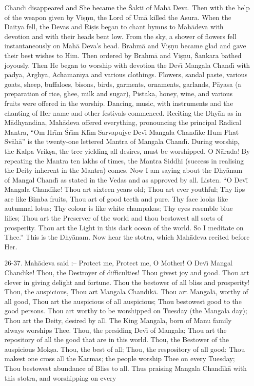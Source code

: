 Chand\={\i} disappeared and She became the \'Sakti of Mah\=a Deva. Then with the help of the weapon given by Vi\d{s}\d{n}u, the Lord of Um\=a killed the Asura. When the Daitya fell, the Devas and \d{R}i\d{s}is began to chant hymns to Mah\=adeva with devotion and with their heads bent low. From the sky, a shower of flowers fell instantaneously on Mah\=a Deva's head. Brahm\=a and Vi\d{s}\d{n}u became glad and gave their best wishes to Him. Then ordered by Brahm\=a and Vi\d{s}\d{n}u, \'Sankara bathed joyously. Then He began to worship with devotion the Dev\={\i} Mangala Chand\={\i} with p\=adya, Arghya, \=Achaman\={\i}ya and various clothings. Flowers, sandal paste, various goats, sheep, buffaloes, bisons, birds, garments, ornaments, garlands, P\=ayasa (a preparation of rice, ghee, milk and sugar), Pistaka, honey, wine, and various fruits were offered in the worship. Dancing, music, with instruments and the chanting of Her name and other festivals commenced. Reciting the Dhy\=an as in M\=adhyandina, Mah\=adeva offered everything, pronouncing the principal Radical Mantra, ``Om Hr\={\i}m \'Sr\={\i}m Kl\={\i}m Sarvapujye Dev\={\i} Mangala Chand\={\i}ke Hum Phat Sv\=ah\=a'' is the twenty-one lettered Mantra of Mangala Chand\={\i}. During worship, the Kalpa Vrik\d{s}a, the tree yielding all desires, must be worshipped. O N\=arada! By repeating the Mantra ten lakhs of times, the Mantra Siddhi (success in realising the Deity inherent in the Mantra) comes. Now I am saying about the Dhy\=anam of Mangal Chand\={\i} as stated in the Vedas and as approved by all. Listen. ``O Dev\={\i} Mangala Chand\={\i}ke! Thou art sixteen years old; Thou art ever youthful; Thy lips are like Bimba fruits, Thou art of good teeth and pure. Thy face looks like autumnal lotus; Thy colour is like white champakas; Thy eyes resemble blue lilies; Thou art the Preserver of the world and thou bestowest all sorts of prosperity. Thou art the Light in this dark ocean of the world. So I meditate on Thee.'' This is the Dhy\=anam. Now hear the stotra, which Mah\=adeva recited before Her.

26-37. Mah\=adeva said :-- Protect me, Protect me, O Mother! O Dev\={\i} Mangal Chand\={\i}ke! Thou, the Destroyer of difficulties! Thou givest joy and good. Thou art clever in giving delight and fortune. Thou the bestower of all bliss and prosperity! Thou, the auspicious, Thou art Mangala Chand\={\i}k\=a. Thou art Mangal\=a, worthy of all good, Thou art the auspicious of all auspicious; Thou bestowest good to the good persons. Thou art worthy to be worshipped on Tuesday (the Mangala day); Thou art the Deity, desired by all. The King Mangala, born of Manu family always worships Thee. Thou, the presiding Dev\={\i} of Mangala; Thou art the repository of all the good that are in this world. Thou, the Bestower of the auspicious Mok\d{s}a. Thou, the best of all; Thou, the respository of all good; Thou makest one cross all the Karmas; the people worship Thee on every Tuesday; Thou bestowest abundance of Bliss to all. Thus praising Mangala Chand\={\i}k\=a with this stotra, and worshipping on every

